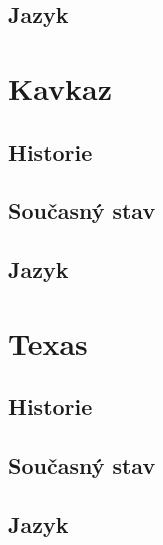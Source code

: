 \hypertarget{jazyk-1}{%
\subsection{Jazyk}\label{jazyk-1}}

\hypertarget{kavkaz}{%
\section{Kavkaz}\label{kavkaz}}

\hypertarget{historie-2}{%
\subsection{Historie}\label{historie-2}}

\hypertarget{souux10dasnuxfd-stav-2}{%
\subsection{Současný stav}\label{souux10dasnuxfd-stav-2}}

\hypertarget{jazyk-2}{%
\subsection{Jazyk}\label{jazyk-2}}

\hypertarget{texas}{%
\section{Texas}\label{texas}}

\hypertarget{historie-3}{%
\subsection{Historie}\label{historie-3}}

\hypertarget{souux10dasnuxfd-stav-3}{%
\subsection{Současný stav}\label{souux10dasnuxfd-stav-3}}

\hypertarget{jazyk-3}{%
\subsection{Jazyk}\label{jazyk-3}}
